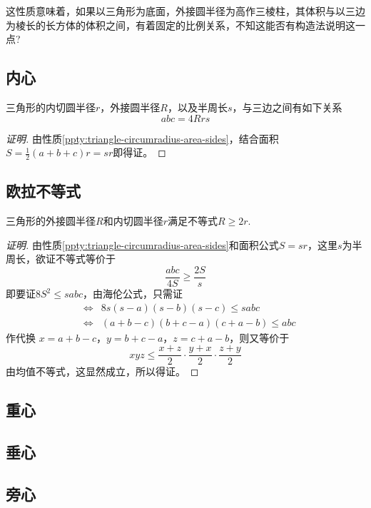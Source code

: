 这性质意味着，如果以三角形为底面，外接圆半径为高作三棱柱，其体积与以三边为棱长的长方体的体积之间，有着固定的比例关系，不知这能否有构造法说明这一点?

\subsection{内心}
\label{sec:triangle-incenter}

\begin{property}
  三角形的内切圆半径$r$，外接圆半径$R$，以及半周长$s$，与三边之间有如下关系
  \begin{equation}
    \label{eq:triangle-abc-equal-4Rrs}
    abc = 4Rrs
  \end{equation}
\end{property}

\begin{proof}[证明]
 由性质\ref{ppty:triangle-circumradius-area-sides}，结合面积$S=\frac{1}{2}(a+b+c)r=sr$即得证。
\end{proof}

\subsection{欧拉不等式}
\label{sec:euler-inequality}

\begin{theorem}
  三角形的外接圆半径$R$和内切圆半径$r$满足不等式$R \geqslant 2r$.
\end{theorem}

\begin{proof}[证明]
  由性质\ref{ppty:triangle-circumradius-area-sides}和面积公式$S=sr$，这里$s$为半周长，欲证不等式等价于
  \begin{equation*}
    \frac{abc}{4S} \geqslant \frac{2S}{s}
  \end{equation*}
  即要证$8S^2 \leqslant sabc$，由海伦公式，只需证
  \begin{eqnarray*}
    & \Longleftrightarrow & 8s(s-a)(s-b)(s-c) \leqslant sabc \\
    & \Longleftrightarrow & (a+b-c)(b+c-a)(c+a-b) \leqslant abc
  \end{eqnarray*}
  作代换 $x=a+b-c$，$y=b+c-a$，$z=c+a-b$，则又等价于
  \begin{equation*}
    xyz \leqslant \frac{x+z}{2} \cdot \frac{y+x}{2} \cdot \frac{z+y}{2}
  \end{equation*}
  由均值不等式，这显然成立，所以得证。
\end{proof}

\subsection{重心}
\label{sec:triangle-centroid}

\subsection{垂心}
\label{sec:triangle-orthocentre}

\subsection{旁心}
\label{sec:escenter}



